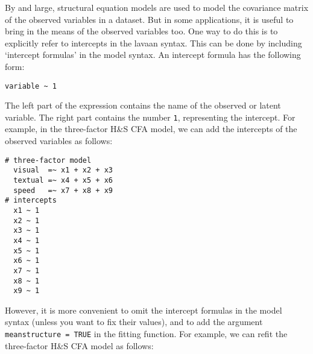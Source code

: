 By and large, structural equation models are used to model the
covariance matrix of the observed variables in a dataset. But in some
applications, it is useful to bring in the means of the observed
variables too. One way to do this is to explicitly refer to intercepts
in the lavaan syntax. This can be done by including `intercept formulas'
in the model syntax. An intercept formula has the following form:

\begin{verbatim}
variable ~ 1
\end{verbatim}

The left part of the expression contains the name of the observed or
latent variable. The right part contains the number \texttt{1},
representing the intercept. For example, in the three-factor H\&S CFA
model, we can add the intercepts of the observed variables as follows:

\begin{verbatim}
# three-factor model
  visual  =~ x1 + x2 + x3
  textual =~ x4 + x5 + x6
  speed   =~ x7 + x8 + x9
# intercepts
  x1 ~ 1
  x2 ~ 1
  x3 ~ 1
  x4 ~ 1
  x5 ~ 1
  x6 ~ 1
  x7 ~ 1
  x8 ~ 1
  x9 ~ 1
\end{verbatim}

However, it is more convenient to omit the intercept formulas in the
model syntax (unless you want to fix their values), and to add the
argument \texttt{meanstructure\ =\ TRUE} in the fitting function. For
example, we can refit the three-factor H\&S CFA model as follows:

\begin{Shaded}
\begin{Highlighting}[]
\OtherTok{\textless{}{-}} 
            \NormalTok{)}
\end{Highlighting}
\end{Shaded}

